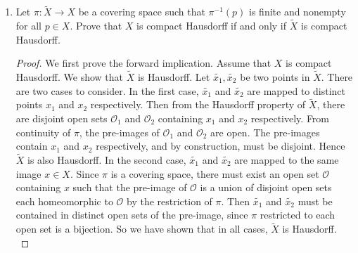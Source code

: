 \documentclass{article}
\begin{document}
\begin{enumerate}
\begin{enumerate}
      \item Prove that the map $\pi:\mathbb{C}\rightarrow\mathbb{C}$
        defined by $\pi(z)=z^2$ is not a covering space.

        \begin{proof}
          If $\pi$ is a covering space, then given any $z\in\mathbb{C}$ and
          open set $\mathcal{O}$ containing $z$, the cardinality of the
          pre-image of each element in $\mathcal{O}$ should be the same.
          However at $z=0$ and given any open ball $B_\epsilon(0)$ around
          $z$, we have $|\pi^{-1}(0)|=|\{0\}|=1$, but
          $|\pi^{-1}(\epsilon/2)|=|\{-\sqrt{\epsilon/2},\sqrt{\epsilon/2}\}|=2$,
          so $\pi$ cannot be a covering space.
        \end{proof}
    \end{enumerate}

  \item Let $\pi:\tilde{X}\rightarrow X$ be a covering space such that
    $\pi^{-1}(p)$ is finite and nonempty for all $p\in X$. Prove that $X$ is
    compact Hausdorff if and only if $\tilde{X}$ is compact Hausdorff.

    \begin{proof}
      We first prove the forward implication. Assume that $X$ is compact
      Hausdorff. We show that $\tilde{X}$ is Hausdorff. Let
      $\tilde{x_1},\tilde{x_2}$ be two points in $\tilde{X}$. There are two
      cases to consider. In the first case, $\tilde{x_1}$ and $\tilde{x_2}$
      are mapped to distinct points $x_1$ and $x_2$ respectively. Then from
      the Hausdorff property of $\tilde{X}$, there are disjoint open sets
      $\mathcal{O}_1$ and $\mathcal{O}_2$ containing $x_1$ and $x_2$
      respectively. From continuity of $\pi$, the pre-images of
      $\mathcal{O}_1$ and $\mathcal{O}_2$ are open. The pre-images contain
      $x_1$ and $x_2$ respectively, and by construction, must be disjoint.
      Hence $\tilde{X}$ is also Hausdorff. In the second case,
      $\tilde{x_1}$ and $\tilde{x_2}$ are mapped to the same image $x\in
      X$. Since $\pi$ is a covering space, there must exist an open set
      $\mathcal{O}$ containing $x$ such that the pre-image of $\mathcal{O}$
      is a union of disjoint open sets each homeomorphic to $\mathcal{O}$
      by the restriction of $\pi$. Then $\tilde{x_1}$ and $\tilde{x_2}$
      must be contained in distinct open sets of the pre-image, since $\pi$
      restricted to each open set is a bijection. So we have shown that in
      all cases, $\tilde{X}$ is Hausdorff. \\


\end{proof}
\end{enumerate}
\end{document}
